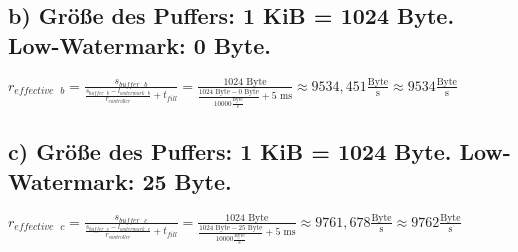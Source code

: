 \documentclass{ti2}
\begin{document}
	\subsection*{b) Größe des Puffers: 1 KiB = 1024 Byte. Low-Watermark: 0 Byte.}
		$r_{effective \text{ } b} = \frac{s_{buffer \text{ } b}}{\frac{s_{buffer \text{ } b} - l_{watermark \text{ } b}}{r_{controller}} + t_{fill}} = \frac{1024 \text{ Byte}}{\frac{1024 \text{ Byte} - 0 \text{ Byte}}{10000 \frac{ \text{Byte}}{\text{s}}} + 5 \text{ ms}} \approx 9534,451 \frac{ \text{Byte}}{\text{s}} \approx 9534 \frac{\text{Byte}}{\text{s}}$
	\subsection*{c) Größe des Puffers: 1 KiB = 1024 Byte. Low-Watermark: 25 Byte.}
		$r_{effective \text{ } c} = \frac{s_{buffer \text{ } c}}{\frac{s_{buffer \text{ } c} - l_{watermark \text{ } c}}{r_{controller}} + t_{fill}} = \frac{1024 \text{ Byte}}{\frac{1024 \text{ Byte} - 25 \text{ Byte}}{10000 \frac{ \text{Byte}}{\text{s}}} + 5 \text{ ms}} \approx 9761,678 \frac{ \text{Byte}}{\text{s}} \approx 9762 \frac{\text{Byte}}{\text{s}}$
\end{document}
